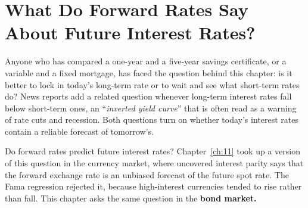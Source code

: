 \makeatletter
{}
\makeatother

\makeatletter
\makeatother

\chapter{What Do Forward Rates Say About Future Interest Rates?}
\label{ch:12}
\providecommand{\term}[1]{\emph{#1}}

Anyone who has compared a one-year and a five-year savings certificate, or a variable and a fixed mortgage, has faced the question behind this chapter: is it better to lock in today's long-term rate or to wait and see what short-term rates do? News reports add a related question whenever long-term interest rates fall below short-term ones, an ``\term{inverted yield curve}'' that is often read as a warning of rate cuts and recession. Both questions turn on whether today's interest rates contain a reliable forecast of tomorrow's.

Do forward rates predict future interest rates? Chapter~\ref{ch:11} took up a version of this question in the currency market, where uncovered interest parity says that the forward exchange rate is an unbiased forecast of the future spot rate. The Fama regression rejected it, because high-interest currencies tended to rise rather than fall. This chapter asks the same question in the \textbf{bond market.}

